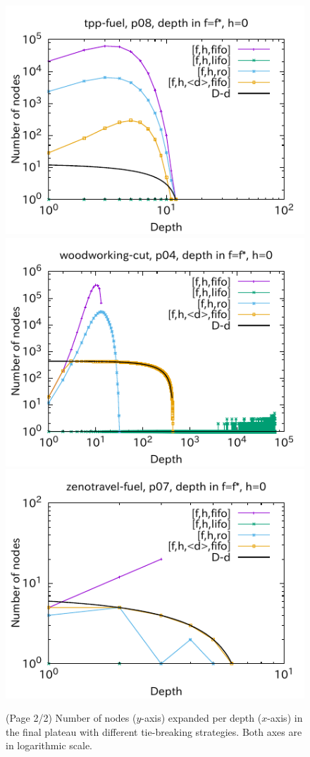 \begin{figure}[htbp]
\includegraphics{img/output-lmcut/tpp-fuel/p08-0.pdf}
\includegraphics{img/output-lmcut/woodworking-cut/p04-0.pdf}
\includegraphics{img/output-lmcut/zenotravel-fuel/p07-0.pdf}
 \caption{(Page 2/2) Number of nodes ($y$-axis) expanded per depth ($x$-axis) in
 the final plateau with different tie-breaking strategies. Both axes are in logarithmic scale.
 }
 \label{fig:depth-histogram3}
\end{figure}

